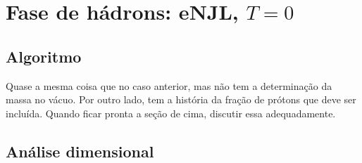 
\FloatBarrier

\section{Fase de hádrons: eNJL, $T = 0$}

\subsection{Algoritmo}

Quase a mesma coisa que no caso anterior, mas não tem a determinação da massa no vácuo. Por outro lado, tem a história da fração de prótons que deve ser incluída. Quando ficar pronta a seção de cima, discutir essa adequadamente.

\subsection{Análise dimensional}

